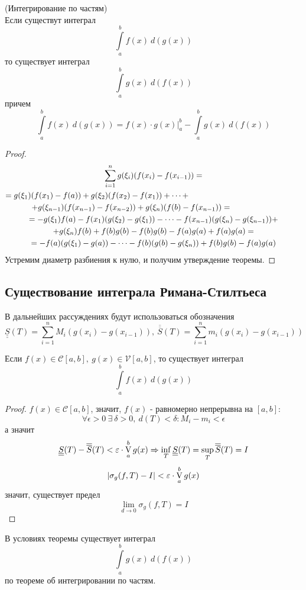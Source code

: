 \begin{numtheorem}
    (Интегрирование по частям)\\
    Если существут интеграл
    \[\int\limits_{a}^{b}f(x)\ d(g(x))\]
    то существует интеграл
    \[\int\limits_{a}^{b}g(x)\ d(f(x))\]
    причем
    \[\int\limits_{a}^{b}f(x)\ d(g(x))=f(x)\cdot g(x)|_a^b - \int\limits_{a}^{b}g(x)\ d(f(x))\]
\end{numtheorem} 
\begin{proof}
    \begin{multline*}
        \sum\limits_{i=1}^{n}g(\xi_i)(f(x_i)-f(x_{i-1}))=\\
        =g(\xi_1)(f(x_1)-f(a))+g(\xi_2)(f(x_2)-f(x_1))+\dots+\tab[5cm]\\
        +g(\xi_{n-1})(f(x_{n-1})-f(x_{n-2}))+g(\xi_{n})(f(b)-f(x_{n-1}))=\tab[2cm]\\
        =-g(\xi_1)f(a)-f(x_1)(g(\xi_2)-g(\xi_1))-\dots-f(x_{n-1})(g(\xi_n)-g(\xi_{n-1}))+\\
        +g(\xi_n)f(b)+f(b)g(b)-f(b)g(b)-f(a)g(a)+f(a)g(a)=\\ %
        =-f(a)(g(\xi_1)-g(a))-\dots-f(b)(g(b)-g(\xi_n))+f(b)g(b)-f(a)g(a)
    \end{multline*}
    Устремим диаметр разбиения к нулю, и получим утверждение теоремы.
\end{proof} 
\subsection{Существование интеграла Римана-Стилтьеса}
В дальнейших рассуждениях будут использоваться обозначения
\[\underline{\underline{S}}(T)=\sum\limits_{i=1}^{n}M_i(g(x_i)-g(x_{i-1})),\ \overline{\overline{S}}(T)=\sum\limits_{i=1}^{n}m_i(g(x_i)-g(x_{i-1}))\] 
\begin{theorem}
    Если $f(x)\in \mathcal{C}[a,b],\ g(x)\in \mathcal{V}[a,b]$, то существует интеграл
    \[\int\limits_{a}^{b}f(x)\ d(g(x))\]
\end{theorem}
\begin{proof}
    $f(x)\in \mathcal{C}[a,b]$, значит, $f(x)$ - равномерно непрерывна на $[a,b]$:
    \[\forall \epsilon>0\ \exists\ \delta>0,\ d(T)<\delta: M_i-m_i<\epsilon\]
    а значит
    \[\underline{\underline{S}}(T)-\overline{\overline{S}}(T)<\varepsilon\cdot \operatorname*{V}\limits_{a}^{b}g(x) \Rightarrow \inf\limits_T \underline{\underline{S}}(T)=\sup\limits_T \overline{\overline{S}}(T)=I\]
    \[|\sigma_g(f,T)-I|<\varepsilon\cdot \operatorname*{V}\limits_{a}^{b}g(x)\]
    значит, существует предел
    \[\lim\limits_{d\to 0}\sigma_g(f,T)=I\]
\end{proof} 
\begin{comm}
    В условиях теоремы существует интеграл
    \[\int\limits_{a}^{b} g(x)\ d(f(x))\]
    по теореме об интегрировании по частям.
\end{comm} 
